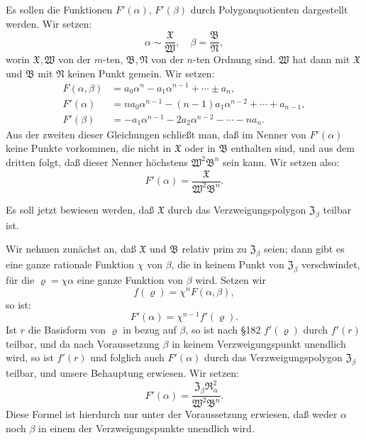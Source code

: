 \documentclass[12pt,a4paper]{article}
\begin{document}
Es sollen die Funktionen $F'(\alpha)$, $F'(\beta)$ durch Polygonquotienten dargestellt werden. Wir setzen:
\begin{equation}\label{eq:196-5}
\alpha \sim \frac{\mathfrak{X}}{\mathfrak{W}}, \quad \beta = \frac{\mathfrak{B}}{\mathfrak{N}},
\end{equation}
worin $\mathfrak{X}, \mathfrak{W}$ von der $m$-ten, $\mathfrak{B}, \mathfrak{N}$ von der $n$-ten Ordnung sind. $\mathfrak{W}$ hat dann mit $\mathfrak{X}$ und $\mathfrak{B}$ mit $\mathfrak{N}$ keinen Punkt gemein. Wir setzen:
\begin{equation}\label{eq:196-6}
\begin{aligned}
F(\alpha, \beta) &= a_0\alpha^n - a_1\alpha^{n-1} + \cdots \pm a_n,\\
F'(\alpha) &= na_0\alpha^{n-1} - (n-1)a_1\alpha^{n-2} + \cdots + a_{n-1},\\
F'(\beta) &= -a_1\alpha^{n-1} - 2a_2\alpha^{n-2} - \cdots - na_n.
\end{aligned}
\end{equation}
Aus der zweiten dieser Gleichungen schließt man, daß im Nenner von $F'(\alpha)$ keine Punkte vorkommen, die nicht in $\mathfrak{X}$ oder in $\mathfrak{B}$ enthalten sind, und aus dem dritten folgt, daß dieser Nenner höchstens $\mathfrak{W}^2 \mathfrak{B}^n$ sein kann. Wir setzen also:
\begin{equation}\label{eq:196-7}
F'(\alpha) = \frac{\mathfrak{X}}{\mathfrak{W}^2 \mathfrak{B}^n}.
\end{equation}

Es soll jetzt bewiesen werden, daß $\mathfrak{X}$ durch das Verzweigungspolygon $\mathfrak{Z}_\beta$ teilbar ist.

Wir nehmen zunächst an, daß $\mathfrak{X}$ und $\mathfrak{B}$ relativ prim zu $\mathfrak{Z}_\beta$ seien; dann gibt es eine ganze rationale Funktion $\chi$ von $\beta$, die in keinem Punkt von $\mathfrak{Z}_\beta$ verschwindet, für die $\varrho = \chi\alpha$ eine ganze Funktion von $\beta$ wird. Setzen wir
\[
f(\varrho) = \chi^n F(\alpha, \beta),
\]
so ist:
\[
F'(\alpha) = \chi^{n-1} f'(\varrho).
\]
Ist $r$ die Basisform von $\varrho$ in bezug auf $\beta$, so ist nach \S 182 $f'(\varrho)$ durch $f'(r)$ teilbar, und da nach Voraussetzung $\beta$ in keinem Verzweigungspunkt unendlich wird, so ist $f'(r)$ und folglich auch $F'(\alpha)$ durch das Verzweigungspolygon $\mathfrak{Z}_\beta$ teilbar, und unsere Behauptung erwiesen. Wir setzen:
\begin{equation}\label{eq:196-8}
F'(\alpha) = \frac{\mathfrak{Z}_\beta \mathfrak{R}_\alpha^2}{\mathfrak{W}^2 \mathfrak{B}^n}.
\end{equation}
Diese Formel ist hierdurch nur unter der Voraussetzung erwiesen, daß weder $\alpha$ noch $\beta$ in einem der Verzweigungspunkte unendlich wird.
\end{document}
